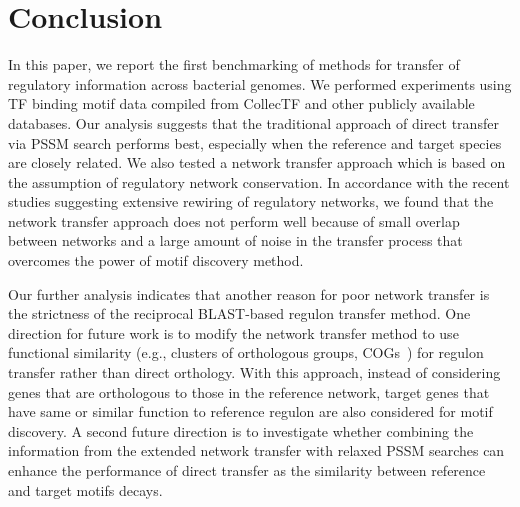\documentclass[]{llncs}
\begin{document}
\section{Conclusion}
In this paper, we report the first benchmarking of methods for transfer of
regulatory information across bacterial genomes. We performed experiments using
TF binding motif data compiled from CollecTF and other publicly available
databases. Our analysis suggests that the traditional approach of direct
transfer via PSSM search performs best, especially when the reference and target
species are closely related. We also tested a network transfer approach which is
based on the assumption of regulatory network conservation. In accordance with
the recent studies suggesting extensive rewiring of regulatory networks, we
found that the network transfer approach does not perform well because of small
overlap between networks and a large amount of noise in the transfer process
that overcomes the power of motif discovery method.

Our further analysis indicates that another reason for poor network transfer is
the strictness of the reciprocal BLAST-based regulon transfer method. One
direction for future work is to modify the network transfer method to use
functional similarity (e.g., clusters of orthologous groups,
COGs~\cite{tatusov1997genomic}) for regulon transfer rather than direct
orthology. With this approach, instead of considering genes that are orthologous
to those in the reference network, target genes that have same or similar
function to reference regulon are also considered for motif discovery. A second
future direction is to investigate whether combining the information from the
extended network transfer with relaxed PSSM searches can enhance the performance
of direct transfer as the similarity between reference and target motifs decays.



\end{document}
